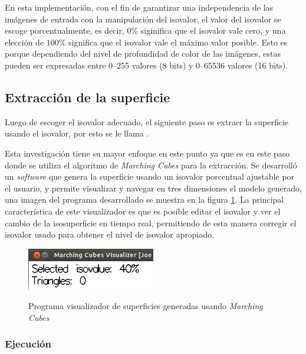 En esta implementación, con el fin de garantizar una independencia de las imágenes de entrada con la manipulación del isovalor, el valor del isovalor se escoge porcentualmente, es decir, $0\%$ siginifica que el isovalor vale cero, y una elección de $100\%$ significa que el isovalor vale el máximo valor posible. Esto es porque dependiendo del nivel de profundidad de color de las imágenes, estas pueden ser expresadas entre 0--255 valores (8 bits) y 0--65536 valores (16 bits).

\subsection{Extracción de la superficie}
\label{ch:propuesta:sec:extraccionDeLaSuperficie}

Luego de escoger el isovalor adecuado, el siguiente paso es extraer la superficie usando el isovalor, por esto se le llama .

Esta investigación tiene su mayor enfoque en este punto ya que es en este paso donde se utiliza el algoritmo de \emph{Marching Cubes} para la extracción. Se desarrolló un \emph{software} que genera la superficie usando un isovalor porcentual ajustable por el usuario, y permite visualizar y navegar en tres dimensiones el modelo generado, una imagen del programa desarrollado se muestra en la figura \ref{f:flujoDeTrabajo:visualizer_1}. La principal característica de este visualizador es que es posible editar el isovalor y ver el cambio de la isosuperficie en tiempo real, permitiendo de esta manera corregir el isovalor usado para obtener el nivel de isovalor apropiado.

\begin{figure}[h]
\centering
	\fbox
	{
		\includegraphics[width=0.5\textwidth]{images/visualizer/visualizer_1.png}
	}
\caption{Programa visualizador de superficies generadas usando \emph{Marching Cubes}}
\label{f:flujoDeTrabajo:visualizer_1}
\end{figure}

\subsubsection{Ejecución}
\label{ch:propuesta:sec:extraccionDeLaSuperficie:subsec:ejecucion}

